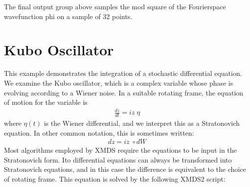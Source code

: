 \documentclass[letterpaper,10pt,english]{sphinxmanual}
\begin{document}
\sphinxAtStartPar
The final output group above samples the mod square of the Fourier\sphinxhyphen{}space wavefunction phi on a sample of 32 points.

\ignorespaces 

\section{Kubo Oscillator}
\label{\detokenize{worked_examples:kubo-oscillator}}\label{\detokenize{worked_examples:kubo}}\label{\detokenize{worked_examples:index-2}}
\sphinxAtStartPar
This example demonstrates the integration of a stochastic differential equation.  We examine the Kubo oscillator, which is a complex variable whose phase is evolving according to a Wiener noise.  In a suitable rotating frame, the equation of motion for the variable is
\begin{equation*}
\begin{split}\frac{dz}{dt} = i z \;\eta\end{split}
\end{equation*}
\sphinxAtStartPar
where \(\eta(t)\) is the Wiener differential, and we interpret this as a Stratonovich equation.  In other common notation, this is sometimes written:
\begin{equation*}
\begin{split}dz = i z \;\circ dW\end{split}
\end{equation*}
\sphinxAtStartPar
Most algorithms employed by XMDS require the equations to be input in the Stratonovich form.  Ito differential equations can always be transformed into Stratonovich equations, and in this case the difference is equivalent to the choice of rotating frame.  This equation is solved by the following XMDS2 script:
\end{document}
